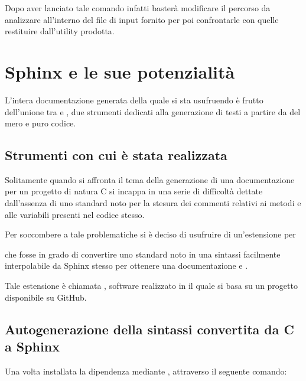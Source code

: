 \documentclass[letterpaper,10pt,italian,openany,oneside]{sphinxmanual}
\begin{document}
Dopo aver lanciato tale comando infatti basterà modificare il percorso da analizzare all’interno del file di input fornito
per poi confrontarle con quelle restituire dall’utility prodotta.


\chapter{Sphinx e le sue potenzialità}
\label{\detokenize{sphinx:sphinx-e-le-sue-potenzialita}}\label{\detokenize{sphinx::doc}}
L’intera documentazione generata della quale si sta usufruendo è frutto dell’unione tra  e , due strumenti
dedicati alla generazione di testi a partire da del mero e puro codice.


\section{Strumenti con cui è stata realizzata}
\label{\detokenize{sphinx:strumenti-con-cui-e-stata-realizzata}}
Solitamente quando si affronta il tema della generazione di una documentazione per un progetto di natura C
si incappa in una serie di difficoltà dettate dall’assenza di uno standard noto per la stesura dei commenti
relativi ai metodi e alle variabili presenti nel codice stesso.

Per soccombere a tale problematiche si è deciso di usufruire di un’estensione per  %
\begin{footnote}[1]\sphinxAtStartFootnote
{}
%
\end{footnote} che fosse in grado
di convertire uno standard noto in una sintassi facilmente interpolabile da Sphinx stesso per
ottenere una documentazione  e .

Tale estensione è chiamata , software realizzato in  il quale si basa su un progetto  disponibile su GitHub.


\section{Autogenerazione della sintassi convertita da C a Sphinx}
\label{\detokenize{sphinx:autogenerazione-della-sintassi-convertita-da-c-a-sphinx}}
Una volta installata la dipendenza mediante , attraverso il seguente comando:
\end{document}
